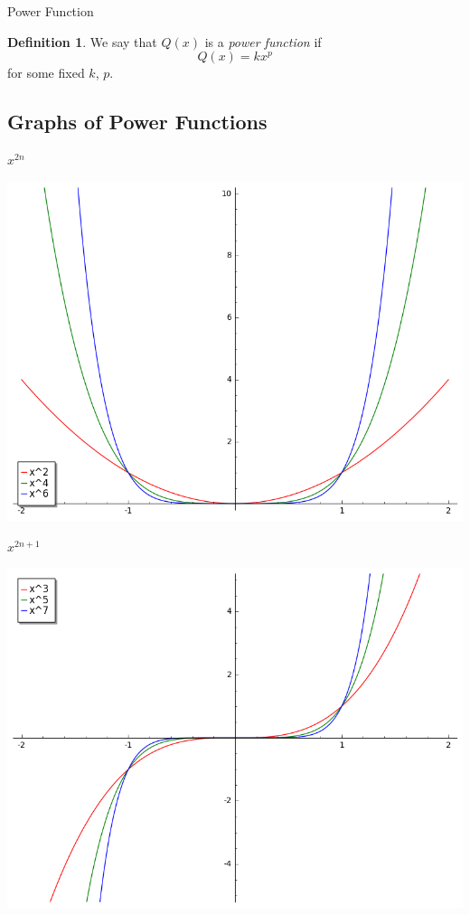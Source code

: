 \documentclass{beamer}
\theoremstyle{definition}
\newtheorem{defn}{Definition}
\newtheorem{rmk}{Remark}
\begin{document}
\begin{frame}{Power Function}
  \begin{defn}
    We say that $Q(x)$ is a {\it power function} if 
    $$Q(x) = kx^p$$
    for some fixed $k$, $p$.
  \end{defn}
\end{frame}

\subsection{Graphs of Power Functions}

\begin{frame}{$x^{2n}$}
  \begin{center}
  \includegraphics[scale=0.5]{imgs/power1.png}
  \end{center}
\end{frame}

\begin{frame}{$x^{2n + 1}$}
  \begin{center}
    \includegraphics[scale=0.5]{imgs/power2.png}
  \end{center}
\end{frame}
\end{document}

